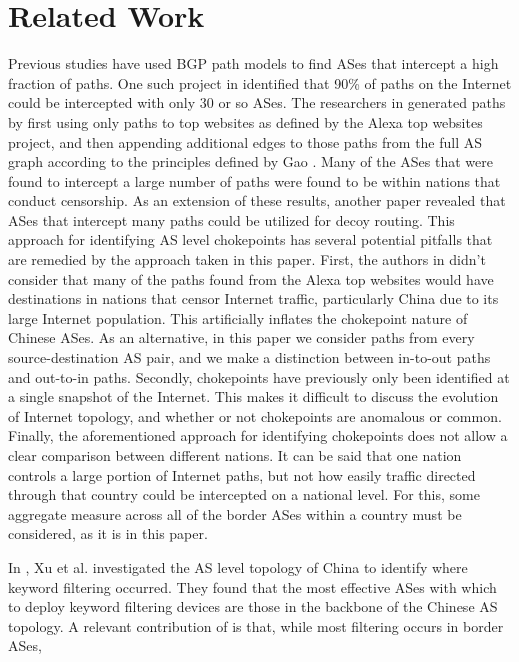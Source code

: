 \documentclass[10pt, conference, letterpaper]{IEEEtran}
\begin{document}
\section{Related Work}   
\par
Previous studies have used BGP path models to find ASes that
intercept a high fraction of paths. One such project in \cite{throats}
identified that 90\% of paths on the Internet could be intercepted with only 30
or so ASes. The researchers in \cite{throats} generated paths by first using
only paths to top websites as defined by the Alexa top websites project,
and then appending additional edges to those paths from the full
AS graph according to the principles defined by Gao \cite{gao}. Many of the
ASes that were found to intercept a large number of paths were found to be
within nations that conduct censorship. As an extension of these results,
another paper \cite{decoy} revealed that ASes that intercept many paths could
be utilized for decoy routing. This approach for identifying AS level
chokepoints has several potential pitfalls that are remedied by the approach
taken in this paper. First, the authors in \cite{throats} didn't consider that
many of the paths found from the Alexa top websites would have destinations in
nations that censor Internet traffic, particularly China due to its large
Internet population. This artificially inflates the chokepoint nature of
Chinese ASes. As an alternative, in this paper we consider paths from every
source-destination AS pair, and we make a distinction between in-to-out paths
and out-to-in paths. Secondly, chokepoints have previously only been
identified at a single snapshot of the Internet. This makes it difficult to
discuss the evolution of Internet topology, and whether or not chokepoints are
anomalous or common. Finally, the aforementioned approach for identifying
chokepoints does not allow a clear comparison between different nations. It
can be said that one nation controls a large portion of Internet paths, but
not how easily traffic directed through that country could be intercepted on a
national level. For this, some aggregate measure across all of the border ASes
within a country must be considered, as it is in this paper.     
\par
In \cite{chinafiltering}, Xu et al. investigated the AS level topology of China
to identify where keyword filtering occurred. They found that the most
effective ASes with which to deploy keyword filtering devices are those in the
backbone of the Chinese AS topology. A relevant contribution of
\cite{chinafiltering} is that, while most filtering occurs in border ASes,
\end{document}
